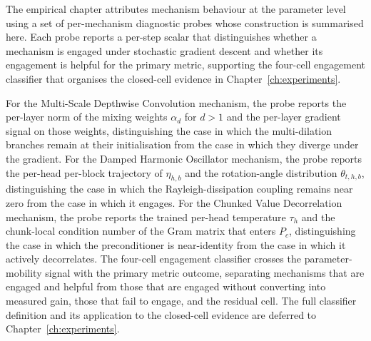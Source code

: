 The empirical chapter attributes mechanism behaviour at the
parameter level using a set of per-mechanism diagnostic probes
whose construction is summarised here. Each probe reports a
per-step scalar that distinguishes whether a mechanism is engaged
under stochastic gradient descent and whether its engagement is
helpful for the primary metric, supporting the four-cell
engagement classifier that organises the closed-cell evidence in
Chapter~\ref{ch:experiments}.

For the Multi-Scale Depthwise Convolution mechanism, the probe
reports the per-layer norm of the mixing weights $\alpha_{d}$ for
$d > 1$ and the per-layer gradient signal on those weights,
distinguishing the case in which the multi-dilation branches remain
at their initialisation from the case in which they diverge under
the gradient. For the Damped Harmonic Oscillator mechanism, the
probe reports the per-head per-block trajectory of $\eta_{h, b}$
and the rotation-angle distribution $\theta_{t, h, b}$,
distinguishing the case in which the Rayleigh-dissipation coupling
remains near zero from the case in which it engages. For the
Chunked Value Decorrelation mechanism, the probe reports the
trained per-head temperature $\tau_{h}$ and the chunk-local
condition number of the Gram matrix that enters $P_{c}$,
distinguishing the case in which the preconditioner is near-identity
from the case in which it actively decorrelates. The four-cell
engagement classifier crosses the parameter-mobility signal with
the primary metric outcome, separating mechanisms that are engaged
and helpful from those that are engaged without converting into
measured gain, those that fail to engage, and the residual cell.
The full classifier definition and its application to the
closed-cell evidence are deferred to Chapter~\ref{ch:experiments}.
